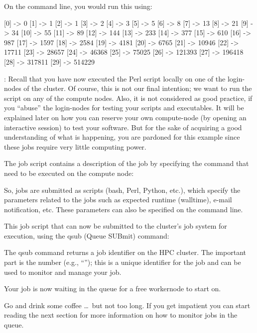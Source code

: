 On the command line, you would run this using:

\begin{prompt}
[0] -> 0
[1] -> 1
[2] -> 1
[3] -> 2
[4] -> 3
[5] -> 5
[6] -> 8
[7] -> 13
[8] -> 21
[9] -> 34
[10] -> 55
[11] -> 89
[12] -> 144
[13] -> 233
[14] -> 377
[15] -> 610
[16] -> 987
[17] -> 1597
[18] -> 2584
[19] -> 4181
[20] -> 6765
[21] -> 10946
[22] -> 17711
[23] -> 28657
[24] -> 46368
[25] -> 75025
[26] -> 121393
[27] -> 196418
[28] -> 317811
[29] -> 514229
\end{prompt}

: Recall that you have now executed the Perl script locally on
one of the login-nodes of the \hpc cluster.  Of course, this is not our final
intention; we want to run the script on any of the compute nodes. Also, it is
not considered as good practice, if you ``abuse'' the login-nodes for testing
your scripts and executables. It will be explained later on how you can
reserve your own compute-node (by opening an interactive session) to test
your software. But for the sake of acquiring a good understanding of what is
happening, you are pardoned for this example since these jobs require very little
computing power.

The job script contains a description of the job by specifying the command that
need to be executed on the compute node:


So, jobs are submitted as scripts (bash, Perl, Python, etc.), which specify the
parameters related to the jobs such as expected runtime (walltime), e-mail
notification, etc. These parameters can also be specified on the command line.

This job script that can now be submitted to the cluster's job system for
execution, using the qsub (Queue SUBmit) command:

\begin{prompt}
\end{prompt}

The qsub command returns a job identifier on the HPC cluster. The important
part is the number (e.g., ``\jobnumber''); this is a unique identifier for the job
and can be used to monitor and manage your job.

Your job is now waiting in the queue for a free workernode to start on.

Go and drink some coffee \dots\ but not too long. If you get impatient you can
start reading the next section for more information on how to monitor jobs in the queue.

